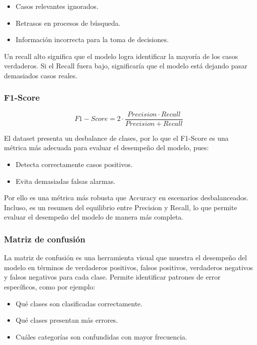 \begin{itemize}
    \item Casos relevantes ignorados.
    \item Retrasos en procesos de búsqueda.
    \item Información incorrecta para la toma de decisiones.
\end{itemize}

Un recall alto significa que el modelo logra identificar la mayoría de los casos verdaderos. Si el Recall fuera bajo, significaría que
el modelo está dejando pasar demasiados casos reales.

\subsubsection{F1-Score}

$$F1-Score = 2 \cdot \frac{Precision \cdot Recall}{Precision + Recall}$$

El dataset presenta un desbalance de clases, por lo que el F1-Score es una métrica más adecuada para evaluar el desempeño del modelo, pues:
\begin{itemize}
    \item Detecta correctamente casos positivos.
    \item Evita demasiadas falsas alarmas.
\end{itemize}

Por ello es una métrica más robusta que Accuracy en escenarios desbalanceados. Incluso, es un resumen del equilibrio entre Precision y Recall,
lo que permite evaluar el desempeño del modelo de manera más completa.

\subsubsection{Matriz de confusión}

La matriz de confusión es una herramienta visual que muestra el desempeño del modelo en términos de verdaderos positivos, falsos positivos,
verdaderos negativos y falsos negativos para cada clase. Permite identificar patrones de error específicos, como por ejemplo:

\begin{itemize}
    \item Qué clases son clasificadas correctamente.
    \item Qué clases presentan más errores.
    \item Cuáles categorías son confundidas con mayor frecuencia.
\end{itemize}

